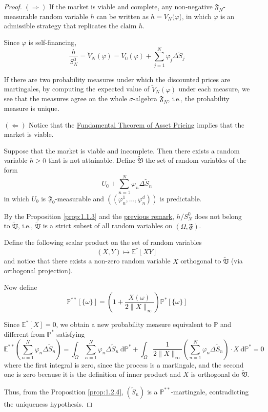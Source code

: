 \begin{proof}
    $(\Rightarrow)$ If the market is viable and complete, any non-negative $\mathfrak{F}_N$-measurable random variable $h$ can be written as $h = V_N(\varphi$), in which $\varphi$ is an admissible strategy that replicates the claim $h$.

    Since $\varphi$ is self-financing, 
    \[
        \frac{h}{S_N^0} = \tilde{V}_N(\varphi) = V_0(\varphi) + \sum_{j=1}^{N} \varphi_j \Delta \tilde{S}_j
    \]

    If there are two probability measures under which the discounted prices are martingales, by computing the expected value of $\tilde{V}_N(\varphi)$ under each measure, we see that the measures agree on the whole $\sigma$-algebra $\mathfrak{F}_N$, i.e., the probability measure is unique.

    $(\Leftarrow)$ Notice that the \hyperref[thm:fund_thm_asset]{Fundamental Theorem of Asset Pricing} implies that the market is viable. 

    Suppose that the market is viable and incomplete. Then there exists a random variable $h \geq 0$ that is not attainable. Define $\tilde{\mathfrak{V}}$ the set of random variables of the form 
    \[
        U_0 + \sum_{n=1}^{N} \varphi_n \Delta \tilde{S}_n 
    \]
    in which $U_0$ is $\mathfrak{F}_0$-measurable and $((\varphi_n^1, \ldots, \varphi_n^d))$ is predictable. 

    By the Proposition \ref{prop:1.1.3} and the \hyperref[rmk:1.3.2]{previous remark}, $h/S_N^0$ does not belong to $\tilde{\mathfrak{V}}$, i.e., $\tilde{\mathfrak{V}}$ is a strict subset of all random variables on $(\Omega, \mathfrak{F})$.

    Define the following scalar product on the set of random variables
    \[
        (X,Y) \longmapsto \mathbb{E}^\ast[XY]
    \]
    and notice that there exists a non-zero random variable $X$ orthogonal to $\tilde{\mathfrak{V}}$ (via orthogonal projection).

    Now define 
    \[
        \mathbb{P}^{\ast \ast}[\{\omega\}] = \left( 1 + \frac{X(\omega)}{2 \| X \|_\infty}\right) \mathbb{P}^\ast[\{\omega\}]
    \]

    Since $\mathbb{E}^\ast[X] = 0$, we obtain a new probability measure equivalent to $\mathbb{P}$ and different from $\mathbb{P}^\ast$ satisfying 
    \[
        \mathbb{E}^{\ast \ast} \left( \sum_{n=1}^{N} \varphi_n \Delta \tilde{S}_n \right) = \int_\Omega \sum_{n=1}^{N} \varphi_n \Delta \tilde{S}_n ~\mathrm{d}\mathbb{P}^\ast + \int_\Omega \frac{1}{2 \| X \|_\infty} \left( \sum_{n=1}^{N} \varphi_n \Delta \tilde{S}_n \right) \cdot X ~\mathrm{d}\mathbb{P}^\ast  = 0
    \]
    where the first integral is zero, since the process is a martingale, and the second one is zero because it is the definition of inner product and $X$ is orthogonal do $\tilde{\mathfrak{V}}$.

    Thus, from the Proposition \ref{prop:1.2.4}, $(\tilde{S}_n)$ is a $\mathbb{P}^{\ast \ast}$-martingale, contradicting the uniqueness hypothesis.
\end{proof}

